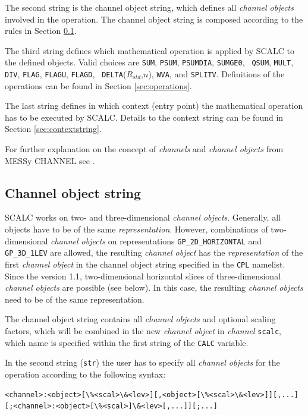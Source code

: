 \documentclass[twoside]{article}
\begin{document}
The second string is the channel object string, which defines all {\it channel objects} involved in the operation. The channel object string is composed according to the rules in Section \ref{sec:objectstring}.

The third string defines which mathematical operation is applied by SCALC to the defined objects.
Valid choices are {\tt SUM}, {\tt PSUM}, {\tt PSUMDIA}, {\tt SUMGE0}, {\tt
  QSUM}, {\tt MULT}, {\tt DIV}, {\tt FLAG}, {\tt FLAGU}, {\tt FLAGD}, {\tt
  DELTA}($R_{std}$,$n$), {\tt WVA}, and {\tt SPLITV}.
Definitions of the operations can be found in Section \ref{sec:operations}.

The last string defines in which context (entry point) the mathematical operation has to be executed by SCALC.
Details to the context string can be found in Section \ref{sec:contextstring}.

For further explanation on the concept of {\it channels} and {\it channel objects} from MESSy CHANNEL see \citet{Jockel2010}.
%
\subsection{Channel object string}
\label{sec:objectstring}
%
SCALC works on two- and three-dimensional {\it channel objects}.
Generally, all objects have to be of the same {\it representation}.
However, combinations of two-dimensional {\it channel objects} on representations {\tt GP\_2D\_HORIZONTAL} and {\tt GP\_3D\_1LEV} are allowed, the resulting {\it channel object} has the {\it representation} of the first {\it channel object} in the channel object string specified in the {\tt CPL} namelist.
Since the version 1.1, two-dimensional horizontal slices of three-dimensional {\it channel objects} are possible (see below).
In this case, the resulting {\it channel objects} need to be of the same representation.

The channel object string contains all {\it channel objects} and optional scaling factors, which will be combined in the new {\it channel object} in {\it channel} {\tt scalc}, which name is specified within the first string of the {\tt CALC} variable.

In the second string ({\tt str}) the user has to specify all {\it channel objects} for the operation according to the following syntax:

\begin{lstlisting}[breaklines=true, %
   basicstyle=\ttfamily,        % the size of the fonts that are used for the code
   breakatwhitespace=true,         % sets if automatic breaks should only happen at whitespace
   prebreak={\raisebox{0ex}[0ex][0ex]{\space\ensuremath{\boldsymbol{\hookleftarrow}}}},
   ]
<channel>:<object>[\%<scal>\&<lev>][,<object>[\%<scal>\&<lev>]][,...] [;<channel>:<object>[\%<scal>]\&<lev>[,...]][;...]
\end{lstlisting}
\end{document}
